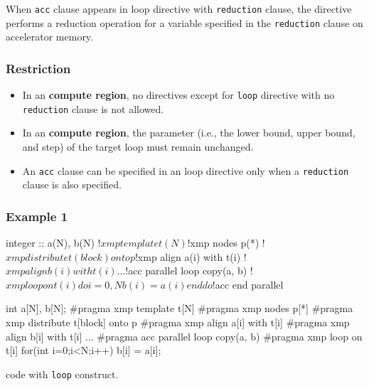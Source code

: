 When {\tt acc} clause appears in {\XMP} loop directive with {\tt reduction} clause,
the directive performs a reduction operation for a variable specified in
the {\tt reduction} clause on accelerator memory.

\subsubsection*{Restriction}

\begin{itemize}
\item In an {\OACC} {\bf compute region}, no \XMP directives except for
	  {\tt loop} directive with no {\tt reduction} clause is not allowed.
\item In an {\OACC} {\bf compute region}, the parameter (i.e., the lower
	  bound, upper bound, and step) of the target loop must
	  remain unchanged.
\item An {\tt acc} clause can be specified in an {\XMP} loop directive 
	  only when a {\tt reduction} clause is also specified.
\end{itemize}

\subsubsection*{Example 1}

\begin{myfigure}
\begin{minipage}{0.45\hsize}
\begin{center}
\begin{XACCFexampleL}
integer :: a(N), b(N)
!$xmp template t(N)
!$xmp nodes p(*)
!$xmp distribute t(block) onto p
!$xmp align a(i) with t(i)
!$xmp align b(i) with t(i)
...
!$acc parallel loop copy(a, b)
!$xmp loop on t(i)
do i=0, N
  b(i) = a(i)
end do
!$acc end parallel
\end{XACCFexampleL}
\end{center}
\end{minipage}
%
\begin{minipage}{0.53\hsize}
\begin{center}
\begin{XACCCexampleR}
int a[N], b[N];
#pragma xmp template t[N]
#pragma xmp nodes p[*]
#pragma xmp distribute t[block] onto p
#pragma xmp align a[i] with t[i]
#pragma xmp align b[i] with t[i]
...
#pragma acc parallel loop copy(a, b)
#pragma xmp loop on t[i]
for(int i=0;i<N;i++){
  b[i] = a[i];
}

\end{XACCCexampleR}
\end{center}
\end{minipage}
\caption{\XACC code with {\OACC} {\tt loop} construct.}\label{code:ex-oacc-loop}
\end{myfigure}

